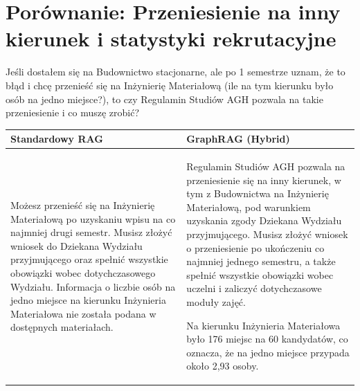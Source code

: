 \newpage

\section*{Porównanie: Przeniesienie na inny kierunek i statystyki rekrutacyjne}

\begin{tcolorbox}[colback=blue!5!white,colframe=blue!75!black,title=Pytanie użytkownika]
    Jeśli dostałem się na Budownictwo stacjonarne, ale po 1 semestrze uznam, że to błąd i chcę przenieść się na Inżynierię Materiałową (ile na tym kierunku było osób na jedno miejsce?), to czy Regulamin Studiów AGH pozwala na takie przeniesienie i co muszę zrobić?
\end{tcolorbox}

\noindent
\begin{tabularx}{\textwidth}{@{} XX @{}}
    \toprule
    \textbf{Standardowy RAG} & \textbf{GraphRAG (Hybrid)} \\
    \midrule
    \small 
    Możesz przenieść się na Inżynierię Materiałową po uzyskaniu wpisu na co najmniej drugi semestr. Musisz złożyć wniosek do Dziekana Wydziału przyjmującego oraz spełnić wszystkie obowiązki wobec dotychczasowego Wydziału. Informacja o liczbie osób na jedno miejsce na kierunku Inżynieria Materiałowa nie została podana w dostępnych materiałach.
    & 
    \small 
    Regulamin Studiów AGH pozwala na przeniesienie się na inny kierunek, w tym z Budownictwa na Inżynierię Materiałową, pod warunkiem uzyskania zgody Dziekana Wydziału przyjmującego. Musisz złożyć wniosek o przeniesienie po ukończeniu co najmniej jednego semestru, a także spełnić wszystkie obowiązki wobec uczelni i zaliczyć dotychczasowe moduły zajęć. 
    
    Na kierunku Inżynieria Materiałowa było 176 miejsc na 60 kandydatów, co oznacza, że na jedno miejsce przypada około 2,93 osoby. \\
    \bottomrule
\end{tabularx}

